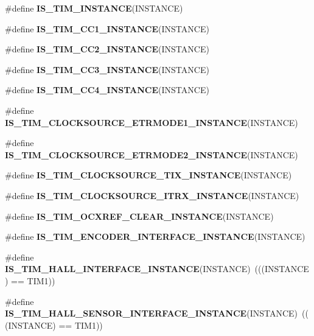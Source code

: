 \begin{DoxyCompactItemize}
\item 
\#define {\bfseries I\+S\+\_\+\+T\+I\+M\+\_\+\+I\+N\+S\+T\+A\+N\+CE}(I\+N\+S\+T\+A\+N\+CE)
\item 
\#define {\bfseries I\+S\+\_\+\+T\+I\+M\+\_\+\+C\+C1\+\_\+\+I\+N\+S\+T\+A\+N\+CE}(I\+N\+S\+T\+A\+N\+CE)
\item 
\#define {\bfseries I\+S\+\_\+\+T\+I\+M\+\_\+\+C\+C2\+\_\+\+I\+N\+S\+T\+A\+N\+CE}(I\+N\+S\+T\+A\+N\+CE)
\item 
\#define {\bfseries I\+S\+\_\+\+T\+I\+M\+\_\+\+C\+C3\+\_\+\+I\+N\+S\+T\+A\+N\+CE}(I\+N\+S\+T\+A\+N\+CE)
\item 
\#define {\bfseries I\+S\+\_\+\+T\+I\+M\+\_\+\+C\+C4\+\_\+\+I\+N\+S\+T\+A\+N\+CE}(I\+N\+S\+T\+A\+N\+CE)
\item 
\#define {\bfseries I\+S\+\_\+\+T\+I\+M\+\_\+\+C\+L\+O\+C\+K\+S\+O\+U\+R\+C\+E\+\_\+\+E\+T\+R\+M\+O\+D\+E1\+\_\+\+I\+N\+S\+T\+A\+N\+CE}(I\+N\+S\+T\+A\+N\+CE)
\item 
\#define {\bfseries I\+S\+\_\+\+T\+I\+M\+\_\+\+C\+L\+O\+C\+K\+S\+O\+U\+R\+C\+E\+\_\+\+E\+T\+R\+M\+O\+D\+E2\+\_\+\+I\+N\+S\+T\+A\+N\+CE}(I\+N\+S\+T\+A\+N\+CE)
\item 
\#define {\bfseries I\+S\+\_\+\+T\+I\+M\+\_\+\+C\+L\+O\+C\+K\+S\+O\+U\+R\+C\+E\+\_\+\+T\+I\+X\+\_\+\+I\+N\+S\+T\+A\+N\+CE}(I\+N\+S\+T\+A\+N\+CE)
\item 
\#define {\bfseries I\+S\+\_\+\+T\+I\+M\+\_\+\+C\+L\+O\+C\+K\+S\+O\+U\+R\+C\+E\+\_\+\+I\+T\+R\+X\+\_\+\+I\+N\+S\+T\+A\+N\+CE}(I\+N\+S\+T\+A\+N\+CE)
\item 
\#define {\bfseries I\+S\+\_\+\+T\+I\+M\+\_\+\+O\+C\+X\+R\+E\+F\+\_\+\+C\+L\+E\+A\+R\+\_\+\+I\+N\+S\+T\+A\+N\+CE}(I\+N\+S\+T\+A\+N\+CE)
\item 
\#define {\bfseries I\+S\+\_\+\+T\+I\+M\+\_\+\+E\+N\+C\+O\+D\+E\+R\+\_\+\+I\+N\+T\+E\+R\+F\+A\+C\+E\+\_\+\+I\+N\+S\+T\+A\+N\+CE}(I\+N\+S\+T\+A\+N\+CE)
\item 
\mbox{\label{group___exported__macro_gacdcc047699e2d83c9d2b3a3f8375dff4}} 
\#define {\bfseries I\+S\+\_\+\+T\+I\+M\+\_\+\+H\+A\+L\+L\+\_\+\+I\+N\+T\+E\+R\+F\+A\+C\+E\+\_\+\+I\+N\+S\+T\+A\+N\+CE}(I\+N\+S\+T\+A\+N\+CE)~(((I\+N\+S\+T\+A\+N\+CE) == T\+I\+M1))
\item 
\mbox{\label{group___exported__macro_ga979ea18ba0931f5ed15cc2f3ac84794b}} 
\#define {\bfseries I\+S\+\_\+\+T\+I\+M\+\_\+\+H\+A\+L\+L\+\_\+\+S\+E\+N\+S\+O\+R\+\_\+\+I\+N\+T\+E\+R\+F\+A\+C\+E\+\_\+\+I\+N\+S\+T\+A\+N\+CE}(I\+N\+S\+T\+A\+N\+CE)~(((I\+N\+S\+T\+A\+N\+CE) == T\+I\+M1))

\end{DoxyCompactItemize}
